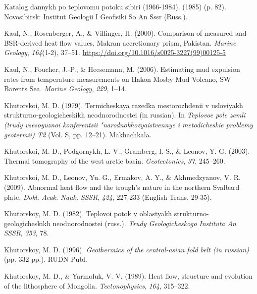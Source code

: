 \documentclass[draft,linenumbers]{agujournal2018}
\begin{document}
\leavevmode{}%
Katalog dannykh po teplovomu potoku sibiri (1966-1984). (1985) (p. 82).
Novosibirsk: Institut Geologii I Geofisiki So An Sssr (Russ.).

\leavevmode{}%
Kaul, N., Rosenberger, A., \& Villinger, H. (2000). Comparison of
measured and {BSR-derived} heat flow values, {Makran} accretionary
prism, {Pakistan}. \emph{Marine Geology}, \emph{164}(1-2), 37--51.
\url{https://doi.org/10.1016/s0025-3227(99)00125-5}

\leavevmode{}%
Kaul, N., Foucher, J.-P., \& Heesemann, M. (2006). Estimating mud
expulsion rates from temperature measurements on {Hakon Mosby Mud
Volcano, SW Barents Sea}. \emph{Marine Geology}, \emph{229}, 1--14.

\leavevmode{}%
Khutorskoi, M. D. (1979). Termicheskaya razedka mestorozhdenii v
usloviyakh strukturno-geologicheskikh neodnorodnostei (in russian). In
\emph{Teplovoe pole zemli (trudy vsesoyuznoi konferentsii
"narodnokhozyaistvennye i metodicheskie problemy geotermii) T2} (Vol. S,
pp. 12--21). Makhachkala.

\leavevmode{}%
Khutorskoi, M. D., Podgornykh, L. V., Gramberg, I. S., \& Leonov, Y. G.
(2003). Thermal tomography of the west arctic basin.
\emph{Geotectonics}, \emph{37}, 245--260.

\leavevmode{}%
Khutorskoi, M. D., Leonov, Yu. G., Ermakov, A. Y., \& Akhmedzyanov, V.
R. (2009). Abnormal heat flow and the trough's nature in the northern
{Svalbard} plate. \emph{Dokl. Acak. Nauk. SSSR}, \emph{424}, 227-233
(English Trans. 29-35).

\leavevmode{}%
Khutorskoy, M. D. (1982). Teplovoi potok v oblastyakh
strukturno-geologicheskikh neodnorodnostei (russ.). \emph{Trudy
Geologicheskogo Instituta An SSSR}, \emph{353}, 78.

\leavevmode{}%
Khutorskoy, M. D. (1996). \emph{Geothermics of the central-asian fold
belt (in russian)} (pp. 332 pp.). RUDN Publ.

\leavevmode{}%
Khutorskoy, M. D., \& Yarmoluk, V. V. (1989). Heat flow, structure and
evolution of the lithosphere of {Mongolia}. \emph{Tectonophysics},
\emph{164}, 315--322.
\end{document}
